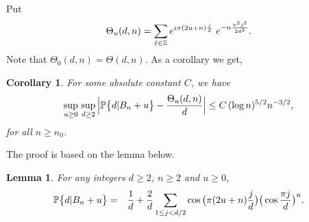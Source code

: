 \documentclass[11pt,draft,reqno]{amsart}
\newtheorem{lemma}[theorem]{Lemma}
\newtheorem{corollary}[theorem]{Corollary}
\theoremstyle{definition}
\theoremstyle{remarks}
\newtheorem{remark}[theorem]{{\bf  Remark}}
\numberwithin{equation}{section}
\def \d{{\delta}}
\def\P{{\mathcal P}}
\def\P{{\mathbb P}}
\def\Z{{\mathbb Z}}
\begin{document}
  Put 
 \begin{equation}\label{theta.u.}
\Theta_u(d,n)  =  \sum_{\ell\in \Z}  e^{i\pi (2u+n){j\over d}}\  e^{  -n  
{\pi^2j^2\over 2d^2}}.
 \end{equation}
 Note that $\Theta_0(d,n)=\Theta(d,n)$.
As a corollary we get,
\begin{corollary}\label{cor.estPdlBn.u} 
For some absolute constant $C$, we have  
\begin{equation*} \sup_{u\ge 0}\, \sup_{d\ge 2}\Big|\P\big\{  d|   B_{ n}+u \big\}-{\Theta_u(d,n)\over d} \Big| \le C \,(\log
n)^{5/2}n^{-3/2} ,
\end{equation*}
for all $n\ge n_0$.
\end{corollary}
    The proof is based on the lemma below. 

 \begin{lemma}\label{reduction.sym} For any integers $d\ge 2$, $n\ge 2$ and $u\ge 0$, 
 \begin{eqnarray*}
  \P\big\{ d| B_n+u\big\}&=& {1\over d} + {2\over d}\sum_{1\le j< d/2} \cos\big(\pi (2u+n){j\over d} \big)\big(\cos { \pi j\over d}\big)^{n}
.
\end{eqnarray*}
 \end{lemma}
 

 
\end{document}
